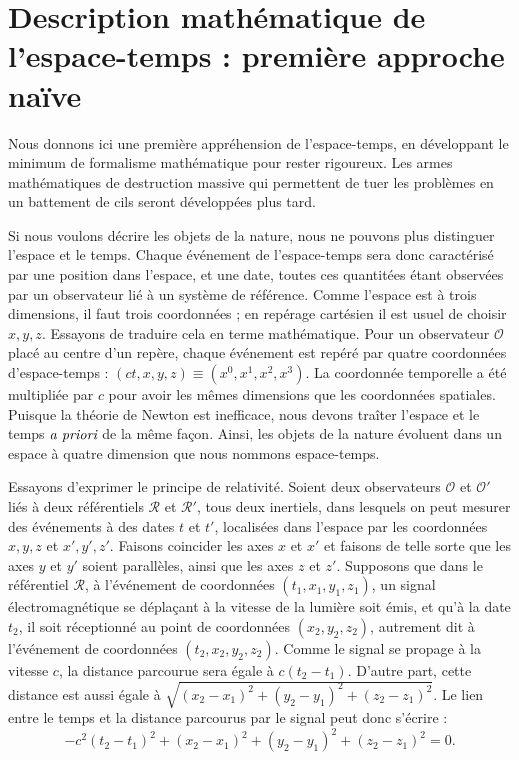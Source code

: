 	\section{Description mathématique de l'espace-temps : première approche naïve} 

		Nous donnons ici une première appréhension de l'espace-temps, en développant le minimum de formalisme mathématique pour rester rigoureux. Les armes mathématiques de destruction massive qui permettent de tuer les problèmes en un battement de cils seront développées plus tard.

		Si nous voulons décrire les objets de la nature, nous ne pouvons plus distinguer l'espace et le temps. Chaque événement de l'espace-temps sera donc caractérisé par une position dans l'espace, et une date, toutes ces quantitées étant observées par un observateur lié à un système de référence. Comme l'espace est à trois dimensions, il faut trois coordonnées ; en repérage cartésien il est usuel de choisir $x,y,z$. Essayons de traduire cela en terme mathématique. Pour un observateur $\mathscr{O}$ placé au centre d'un repère, chaque événement est repéré par quatre coordonnées d'espace-temps : $(ct,x,y,z)\equiv (x^0,x^1,x^2,x^3)$. La coordonnée temporelle a été multipliée par $c$ pour avoir les mêmes dimensions que les coordonnées spatiales. Puisque la théorie de Newton est inefficace, nous devons traîter l'espace et le temps $\emph{a priori}$ de la même façon. Ainsi, les objets de la nature évoluent dans un espace à quatre dimension que nous nommons espace-temps. 

		Essayons d'exprimer le principe de relativité. Soient deux observateurs $\mathscr{O}$ et $\mathscr{O}'$ liés à deux référentiels $\mathscr{R}$ et $\mathscr{R}'$, tous deux inertiels, dans lesquels on peut mesurer des événements à des dates $t$ et $t'$, localisées dans l'espace par les coordonnées $x,y,z$ et $x',y',z'$. Faisons coincider les axes $x$ et $x'$ et faisons de telle sorte que les axes $y$ et $y'$ soient parallèles, ainsi que les axes $z$ et $z'$. Supposons que dans le référentiel $\mathscr{R}$, à l'événement de coordonnées $(t_1,x_1,y_1,z_1)$, un signal électromagnétique se déplaçant à la vitesse de la lumière soit émis, et qu'à la date $t_2$, il soit réceptionné au point de coordonnées $(x_2,y_2,z_2)$, autrement dit à l'événement de coordonnées $(t_2,x_2,y_2,z_2)$. Comme le signal se propage à la vitesse $c$, la distance parcourue sera égale à $c(t_2-t_1)$. D'autre part, cette distance est aussi égale à $\sqrt{(x_2-x_1)^2+(y_2-y_1)^2+(z_2-z_1)^2}$. Le lien entre le temps et la distance parcourus par le signal peut donc s'écrire :
		\begin{equation}
		 	-c^2(t_2-t_1)^2+(x_2-x_1)^2+(y_2-y_1)^2+(z_2-z_1)^2=0. \label{interv_nul}
		\end{equation} 

